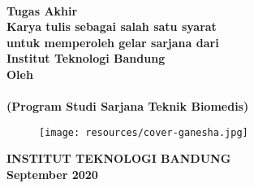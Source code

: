 \clearpage
\pagestyle{empty}


\begin{center}
    
    \smallskip
	\renewcommand{\baselinestretch}{1}
	
    \large{\bfseries \MakeUppercase{\thetitle}}
    \\[5\baselineskip]

    \large{\bfseries Tugas Akhir}
    \\[\baselineskip]
	
    \normalsize{ \bfseries
    	Karya tulis sebagai salah satu syarat\\
    	untuk memperoleh gelar sarjana dari\\
    	Institut Teknologi Bandung
	}
    \\[3\baselineskip]

    \normalsize{ \bfseries Oleh\\}
    \large{ 
    	\bfseries \MakeUppercase{\theauthor}\\
    	(Program Studi Sarjana Teknik Biomedis)
	}

    \vfill
    \begin{figure}[h]
        \centering
      	\texttt{[image: resources/cover-ganesha.jpg]}
    \end{figure}
    \vfill

    \large{ \bfseries
	    \uppercase{
	        Institut Teknologi Bandung\\
	    }
    	September 2020
	}

\end{center}

\restoregeometry
\clearpage
